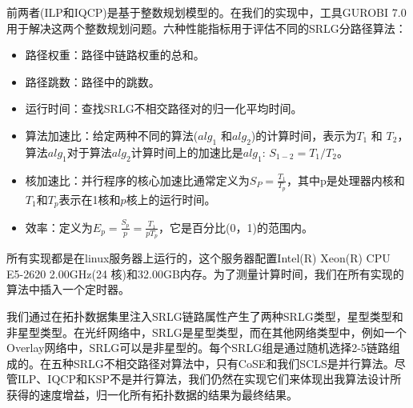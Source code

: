 前两者(ILP和IQCP)是基于整数规划模型的。在我们的实现中，工具GUROBI 7.0\cite{optimization2012gurobi}用于解决这两个整数规划问题。六种性能指标用于评估不同的SRLG分路径算法：
\begin{itemize}
  \item 路径权重：路径中链路权重的总和。
  \item 路径跳数：路径中的跳数。
  \item 运行时间：查找SRLG不相交路径对的归一化平均时间。
  \item 算法加速比：给定两种不同的算法($alg_1$ 和$alg_2$)的计算时间，表示为$T_1$ 和 $T_2$，算法$alg_1$对于算法$alg_2$计算时间上的加速比是$alg_1$: ${S_{1 - 2}} = T_1/T_2$。
  \item 核加速比：并行程序的核心加速比\cite{grama2003introduction}通常定义为$S_P=\frac{T_1}{T_p}$，其中p是处理器内核和$T_1$和$T_p$表示在1核和$p$核上的运行时间。
  \item 效率\cite{grama2003introduction}：定义为$E_p=\frac{S_p}{p}=\frac{T_1}{pT_p}$，它是百分比(0，1)的范围内。


\end{itemize}


所有实现都是在linux服务器上运行的，这个服务器配置Intel(R) Xeon(R) CPU E5-2620  2.00GHz(24 核)和32.00GB内存。为了测量计算时间，我们在所有实现的算法中插入一个定时器。

我们通过在拓扑数据集里注入SRLG链路属性产生了两种SRLG类型，星型类型和非星型类型。在光纤网络中，SRLG是星型类型，而在其他网络类型中，例如一个Overlay网络中，SRLG可以是非星型的。每个SRLG组是通过随机选择2-5链路组成的。在五种SRLG不相交路径对算法中，只有CoSE和我们SCLS是并行算法。尽管ILP、IQCP和KSP不是并行算法，我们仍然在实现它们来体现出我算法设计所获得的速度增益，归一化\cite{tax2000feature}所有拓扑数据的结果为最终结果。


